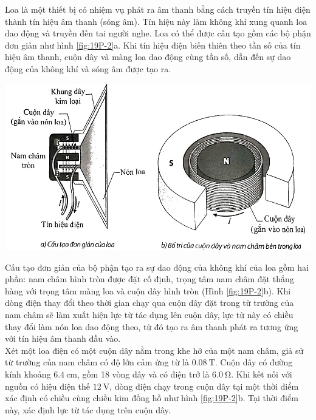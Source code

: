 \begin{ex}
	Loa là một thiết bị có nhiệm vụ phát ra âm thanh bằng cách truyền tín hiệu điện thành tín hiệu âm thanh (sóng âm). Tín hiệu này làm không khí xung quanh loa dao động và truyền đến tai người nghe. Loa có thể được cấu tạo gồm các bộ phận đơn giản như hình \ref{fig:19P-2}a. Khi tín hiệu điện biến thiên theo tần số của tín hiệu âm thanh, cuộn dây và màng loa dao động cùng tần số, dẫn đến sự dao động của không khí và sóng âm được tạo ra.
	\begin{center}
			\includegraphics[width=0.65\linewidth]{../figs/VN12-Y24-PH-SYL-019P-2}
			\label{fig:19P-2}
	\end{center}
	Cấu tạo đơn giản của bộ phận tạo ra sự dao động của không khí của loa gồm hai phần: nam châm hình tròn được đặt cố định, trọng tâm nam châm đặt thẳng hàng với trọng tâm màng loa và cuộn dây hình tròn (Hình \ref{fig:19P-2}b). Khi dòng điện thay đổi theo thời gian chạy qua cuộn dây đặt trong từ trường của nam châm sẽ làm xuất hiện lực từ tác dụng lên cuộn dây, lực từ này có chiều thay đổi làm nón loa dao động theo, từ đó tạo ra âm thanh phát ra tương ứng với tín hiệu âm thanh đầu vào.\\
	Xét một loa điện có một cuộn dây nằm trong khe hở của một nam châm, giả sử từ trường của nam châm có độ lớn cảm ứng từ là $\SI{0.08}{\tesla}$. Cuộn dây có đường kính khoảng $\SI{6.4}{\centi\meter}$, gồm 18 vòng dây và có điện trở là $\SI{6.0}{\ohm}$. Khi kết nối với nguồn có hiệu điện thế $\SI{12}{\volt}$, dòng điện chạy trong cuộn dây tại một thời điểm xác định có chiều cùng chiều kim đồng hồ như hình \ref{fig:19P-2}b. Tại thời điểm này, xác định lực từ tác dụng trên cuộn dây.
\end{ex}
